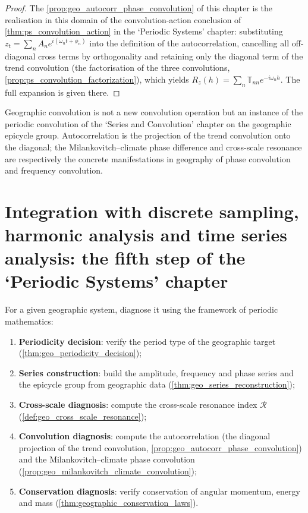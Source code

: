 \begin{proof}
The \cref{prop:geo_autocorr_phase_convolution} of this chapter is the realisation in this domain of the convolution-action conclusion of \cref{thm:ps_convolution_action} in the `Periodic Systems' chapter:
substituting $z_t=\sum_n A_n e^{i(\omega_n t+\phi_n)}$ into the definition of the autocorrelation, cancelling all off-diagonal cross terms by orthogonality and retaining only the diagonal term of the trend convolution
(the factorisation of the three convolutions, \cref{prop:ps_convolution_factorization}), which yields $R_z(h)=\sum_n\mathbb T_{nn}e^{-i\omega_n h}$.
The full expansion is given there.
\end{proof}

\begin{remark}\label{rem:geo_convolution_relation}
Geographic convolution is not a new convolution operation but an instance of the periodic convolution of the `Series and Convolution' chapter on the geographic epicycle group. Autocorrelation is the projection of the trend convolution onto the diagonal; the Milankovitch--climate phase difference and cross-scale resonance are respectively the concrete manifestations in geography of phase convolution and frequency convolution.
\end{remark}

\section{Integration with discrete sampling, harmonic analysis and time series analysis: the fifth step of the `Periodic Systems' chapter}
\label{sec:geo_integration}

\begin{definition}\label{def:geo_periodic_diagnosis}
For a given geographic system, diagnose it using the framework of periodic mathematics:
\begin{enumerate}[label=(\roman*)]
    \item \textbf{Periodicity decision}: verify the period type of the geographic target (\cref{thm:geo_periodicity_decision});
    \item \textbf{Series construction}: build the amplitude, frequency and phase series and the epicycle group from geographic data (\cref{thm:geo_series_reconstruction});
    \item \textbf{Cross-scale diagnosis}: compute the cross-scale resonance index $\mathcal R$ (\cref{def:geo_cross_scale_resonance});
    \item \textbf{Convolution diagnosis}: compute the autocorrelation (the diagonal projection of the trend convolution, \cref{prop:geo_autocorr_phase_convolution}) and the Milankovitch--climate phase convolution (\cref{prop:geo_milankovitch_climate_convolution});
    \item \textbf{Conservation diagnosis}: verify conservation of angular momentum, energy and mass (\cref{thm:geographic_conservation_laws}).
\end{enumerate}
\end{definition}

